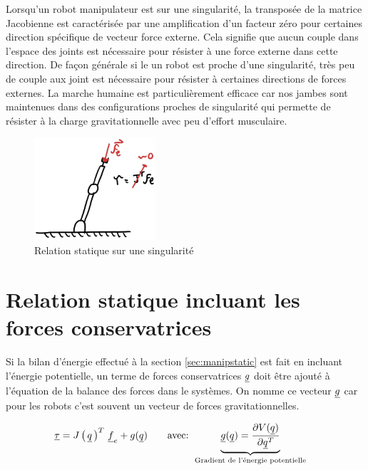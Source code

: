 Lorsqu'un robot manipulateur est sur une singularité, la transposée de la matrice Jacobienne est caractérisée par une amplification d'un facteur zéro pour certaines direction spécifique de vecteur force externe. Cela signifie que aucun couple dans l'espace des joints est nécessaire pour résister à une force externe dans cette direction. De façon générale si le un robot est proche d'une singularité, très peu de couple aux joint est nécessaire pour résister à certaines directions de forces externes. La marche humaine est particulièrement efficace car nos jambes sont maintenues dans des configurations proches de singularité qui permette de résister à la charge gravitationnelle avec peu d'effort musculaire. 
\begin{figure}[H]
	\centering
		\includegraphics[width=0.40\textwidth]{fig/externalforcesingularity.jpg}
	\caption{Relation statique sur une singularité}
	\label{fig:externalforcesingularity}
\end{figure}


\section{Relation statique incluant les forces conservatrices}
\label{sec:manipstaticconservative}

Si la bilan d'énergie effectué à la section \ref{sec:manipstatic} est fait en incluant l'énergie potentielle, un terme de forces conservatrices $\underline{g}$ doit être ajouté à l'équation de la balance des forces dans le systèmes. On nomme ce vecteur $\underline{g}$ car pour les robots c'est souvent un vecteur de forces gravitationnelles. 

\begin{align}
\underline{\tau} &= J\left( \, \underline{q} \, \right)^T \, \underline{f}_e +  g( \underline{q} )
\quad \quad \text{avec:  }
\underbrace{ \underline{g} ( \underline{q} ) = 
\frac{ \partial V(\underline{q} ) }{\partial \underline{q}^T } 
}_{\text{Gradient de l'énergie potentielle}}
\label{eq:staticgravity}
\end{align}

